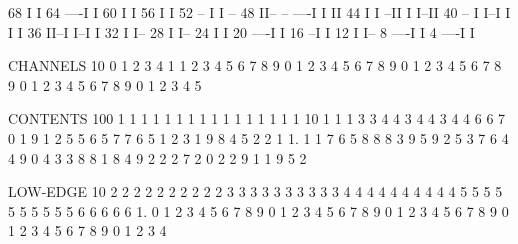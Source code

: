 \begin{Listing}
       68                                               I                                      I
       64                                           ----I                                      I
       60                                           I                                          I
       56                                           I                                          I
       52                           --              I                                          I  --
       48                           II--    --  ----I                                          I  II
       44                           I  I  --II  I                                              I--II
       40                       --  I  I--I  I  I                                                  I
       36                       II--I        I--I                                                  I
       32                       I                                                                  I--
       28                       I                                                                    I--
       24                       I                                                                      I
       20                   ----I                                                                      I
       16                 --I                                                                          I
       12                 I                                                                            I--
        8             ----I                                                                              I
        4         ----I                                                                                  I
 
 CHANNELS  10    0                 1                   2                   3                   4             
            1    1 2 3 4 5 6 7 8 9 0 1 2 3 4 5 6 7 8 9 0 1 2 3 4 5 6 7 8 9 0 1 2 3 4 5 6 7 8 9 0 1 2 3 4 5   
 
 CONTENTS 100                                              1 1   1 1 1 1 1 1 1 1 1 1 1 1 1 1              
           10              1 1 1 3 3 4 4 3 4 4 3 4 4 6 6 7 0 1 9 1 2 5 5 6 5 7 7 6 5 1 2 3 1 9 8 4 5 2 2 1
            1.     1 1 7 6 5 8 8 8 3 9 5 9 2 5 3 7 6 4 4 9 0 4 3 3 8 8 1 8 4 9 2 2 2 7 2 0 2 2 9 1 1 9 5 2
 
 LOW-EDGE  10   2 2 2 2 2 2 2 2 2 2 3 3 3 3 3 3 3 3 3 3 4 4 4 4 4 4 4 4 4 4 5 5 5 5 5 5 5 5 5 5 6 6 6 6 6 
            1.  0 1 2 3 4 5 6 7 8 9 0 1 2 3 4 5 6 7 8 9 0 1 2 3 4 5 6 7 8 9 0 1 2 3 4 5 6 7 8 9 0 1 2 3 4 
 

\end{Listing}
